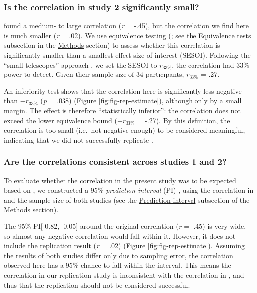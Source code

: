 \documentclass[11pt,]{memoir}
\begin{document}
\hypertarget{is-the-correlation-in-study-2-significantly-small}{%
\subsubsection{Is the correlation in study 2 significantly small?}\label{is-the-correlation-in-study-2-significantly-small}}

\textcite{London2015} found a medium- to large correlation (\emph{r} = -.45), but the correlation we find here is much smaller (\emph{r} = .02). We use equivalence testing (\textcite{Lakens2018}; see the \protect\hyperlink{eq}{Equivalence tests} subsection in the \protect\hyperlink{AB_tDCS-methods}{Methods} section) to assess whether this correlation is significantly smaller than a smallest effect size of interest (SESOI). Following the ``small telescopes'' approach \autocite{Simonsohn2015}, we set the SESOI to \(r_{33\%}\), the correlation \textcite{London2015} had 33\% power to detect. Given their sample size of 34 participants, \(r_{33\%}\) = .27.

An inferiority test shows that the correlation here is significantly less negative than \(-r_{33\%}\) (\emph{p} = .038) (Figure \ref{fig:fig-rep-estimate}), although only by a small margin. The effect is therefore ``statistically inferior'': the correlation does not exceed the lower equivalence bound (\(-r_{33\%}\) = -.27). By this definition, the correlation is too small (i.e.~not negative enough) to be considered meaningful, indicating that we did not successfully replicate \textcite{London2015}.

\hypertarget{are-the-correlations-consistent-across-studies-1-and-2}{%
\subsubsection{Are the correlations consistent across studies 1 and 2?}\label{are-the-correlations-consistent-across-studies-1-and-2}}

To evaluate whether the correlation in the present study was to be expected based on \textcite{London2015}, we constructed a 95\% \emph{prediction interval} (PI) \autocite{Spence2016}, using the correlation in \textcite{London2015} and the sample size of both studies (see the \protect\hyperlink{pi}{Prediction interval} subsection of the \protect\hyperlink{AB_tDCS-methods}{Methods} section).

The 95\% PI{[}-0.82, -0.05{]} around the original correlation (\emph{r} = -.45) is very wide, so almost any negative correlation would fall within it. However, it does not include the replication result (\emph{r} = .02) (Figure \ref{fig:fig-rep-estimate}). Assuming the results of both studies differ only due to sampling error, the correlation observed here has a 95\% chance to fall within the interval. This means the correlation in our replication study is inconsistent with the correlation in \textcite{London2015}, and thus that the replication should not be considered successful.
\end{document}
